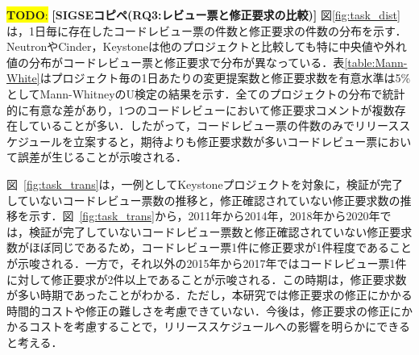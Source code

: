 \documentclass[11pt]{jreport}
\newcommand{\todo}[1]{\colorbox{yellow}{{\bf TODO}:}{\color{red} {\textbf{[#1]}}}}
\begin{document}
\todo{SIGSEコピペ(RQ3:レビュー票と修正要求の比較)}
図\ref{fig:task_dist}は，1日毎に存在したコードレビュー票の件数と修正要求の件数の分布を示す．NeutronやCinder，Keystoneは他のプロジェクトと比較しても特に中央値や外れ値の分布がコードレビュー票と修正要求で分布が異なっている．表\ref{table:Mann-White}はプロジェクト毎の1日あたりの変更提案数と修正要求数を有意水準は5\%としてMann-WhitneyのU検定の結果を示す．全てのプロジェクトの分布で統計的に有意な差があり，1つのコードレビューにおいて修正要求コメントが複数存在していることが多い．したがって，コードレビュー票の件数のみでリリーススケジュールを立案すると，期待よりも修正要求数が多いコードレビュー票において誤差が生じることが示唆される．

図~\ref{fig:task_trans}は，一例としてKeystoneプロジェクトを対象に，検証が完了していないコードレビュー票数の推移と，修正確認されていない修正要求数の推移を示す．図~\ref{fig:task_trans}から，2011年から2014年，2018年から2020年では，検証が完了していないコードレビュー票数と修正確認されていない修正要求数がほぼ同じであるため，コードレビュー票1件に修正要求が1件程度であることが示唆される．一方で，それ以外の2015年から2017年ではコードレビュー票1件に対して修正要求が2件以上であることが示唆される．この時期は，修正要求数が多い時期であったことがわかる．ただし，本研究では修正要求の修正にかかる時間的コストや修正の難しさを考慮できていない．今後は，修正要求の修正にかかるコストを考慮することで，リリーススケジュールへの影響を明らかにできると考える．

\begin{table}[t]
\centering
  \caption{プロジェクト毎の1日あたりの変更提案数と修正要求数の分布}
  \label{table:Mann-White}
\end{table}
\end{document}
